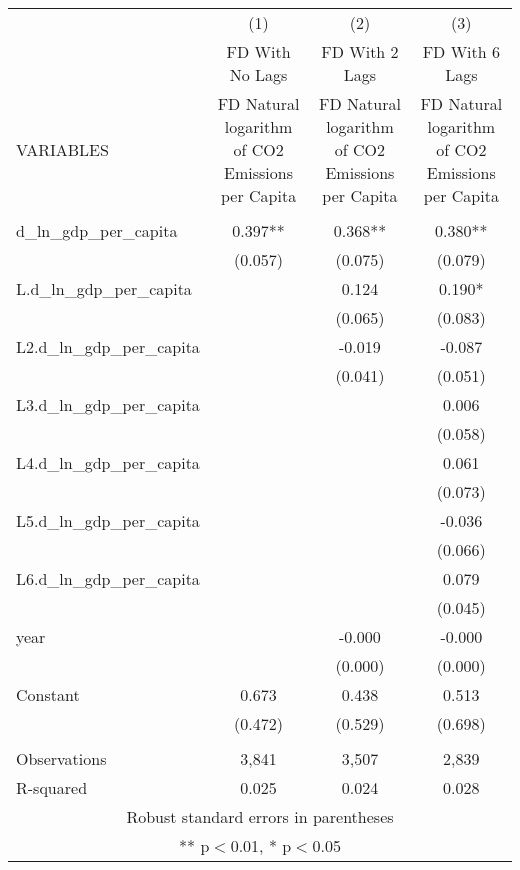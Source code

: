 \begin{tabular}{lccc} \hline
 & (1) & (2) & (3) \\
 & FD With No Lags & FD With 2 Lags & FD With 6 Lags \\
VARIABLES & FD Natural logarithm of CO2 Emissions per Capita & FD Natural logarithm of CO2 Emissions per Capita & FD Natural logarithm of CO2 Emissions per Capita \\ \hline
 &  &  &  \\
d\_ln\_gdp\_per\_capita & 0.397** & 0.368** & 0.380** \\
 & (0.057) & (0.075) & (0.079) \\
L.d\_ln\_gdp\_per\_capita &  & 0.124 & 0.190* \\
 &  & (0.065) & (0.083) \\
L2.d\_ln\_gdp\_per\_capita &  & -0.019 & -0.087 \\
 &  & (0.041) & (0.051) \\
L3.d\_ln\_gdp\_per\_capita &  &  & 0.006 \\
 &  &  & (0.058) \\
L4.d\_ln\_gdp\_per\_capita &  &  & 0.061 \\
 &  &  & (0.073) \\
L5.d\_ln\_gdp\_per\_capita &  &  & -0.036 \\
 &  &  & (0.066) \\
L6.d\_ln\_gdp\_per\_capita &  &  & 0.079 \\
 &  &  & (0.045) \\
year &  & -0.000 & -0.000 \\
 &  & (0.000) & (0.000) \\
Constant & 0.673 & 0.438 & 0.513 \\
 & (0.472) & (0.529) & (0.698) \\
 &  &  &  \\
Observations & 3,841 & 3,507 & 2,839 \\
 R-squared & 0.025 & 0.024 & 0.028 \\ \hline
\multicolumn{4}{c}{ Robust standard errors in parentheses} \\
\multicolumn{4}{c}{ ** p$<$0.01, * p$<$0.05} \\
\end{tabular}
